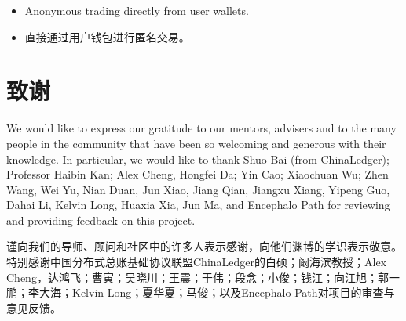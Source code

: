 \documentclass[UTF8,nofonts]{ctexart}
\begin{document}
\begin{multicols}{2}
\begin{itemize}
	\item Anonymous trading directly from user wallets.
	\item 直接通过用户钱包进行匿名交易。

\end{itemize}

\section{致谢}
We would like to express our gratitude to our mentors, advisers and to the many people in the community that have been so welcoming and generous with their knowledge. In particular, we would like to thank Shuo Bai (from ChinaLedger); Professor Haibin Kan; Alex Cheng, Hongfei Da; Yin Cao; Xiaochuan Wu; Zhen Wang, Wei Yu, Nian Duan, Jun Xiao, Jiang Qian, Jiangxu Xiang, Yipeng Guo, Dahai Li, Kelvin Long, Huaxia Xia, Jun Ma, and Encephalo Path for reviewing and providing feedback on this project. 

谨向我们的导师、顾问和社区中的许多人表示感谢，向他们渊博的学识表示敬意。特别感谢中国分布式总账基础协议联盟ChinaLedger的白硕；阚海滨教授；Alex Cheng，达鸿飞；曹寅；吴晓川；王震；于伟；段念；小俊；钱江；向江旭；郭一鹏；李大海；Kelvin Long；夏华夏；马俊；以及Encephalo Path对项目的审查与意见反馈。






\end{multicols}
\end{document}
